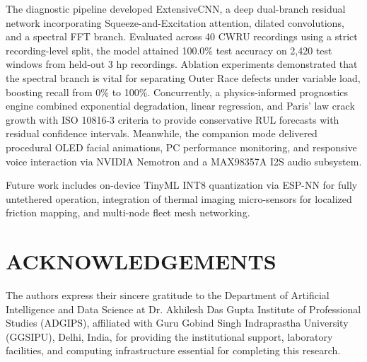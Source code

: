 \documentclass[10pt,journal,onecolumn]{IEEEtran}
\begin{document}
The diagnostic pipeline developed ExtensiveCNN, a deep dual-branch residual network incorporating Squeeze-and-Excitation attention, dilated convolutions, and a spectral FFT branch. Evaluated across 40 CWRU recordings using a strict recording-level split, the model attained 100.0\% test accuracy on 2,420 test windows from held-out 3 hp recordings. Ablation experiments demonstrated that the spectral branch is vital for separating Outer Race defects under variable load, boosting recall from 0\% to 100\%. Concurrently, a physics-informed prognostics engine combined exponential degradation, linear regression, and Paris' law crack growth with ISO 10816-3 criteria to provide conservative RUL forecasts with residual confidence intervals. Meanwhile, the companion mode delivered procedural OLED facial animations, PC performance monitoring, and responsive voice interaction via NVIDIA Nemotron and a MAX98357A I2S audio subsystem.

Future work includes on-device TinyML INT8 quantization via ESP-NN for fully untethered operation, integration of thermal imaging micro-sensors for localized friction mapping, and multi-node fleet mesh networking.

\section*{ACKNOWLEDGEMENTS}
The authors express their sincere gratitude to the Department of Artificial Intelligence and Data Science at Dr. Akhilesh Das Gupta Institute of Professional Studies (ADGIPS), affiliated with Guru Gobind Singh Indraprastha University (GGSIPU), Delhi, India, for providing the institutional support, laboratory facilities, and computing infrastructure essential for completing this research.
\end{document}
